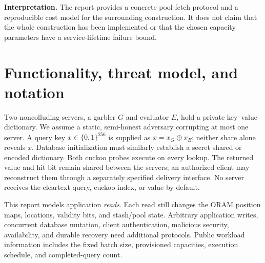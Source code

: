 \documentclass[11pt]{article}
\newcommand{\xor}{\mathbin{\oplus}}
\begin{document}
\textbf{Interpretation.} The report provides a concrete pool-fetch protocol
and a reproducible cost model for the surrounding construction. It does not
claim that the whole construction has been implemented or that the chosen
capacity parameters have a service-lifetime failure bound.

\clearpage
{\small\setlength{\parskip}{0pt}\tableofcontents}
\clearpage

\section{Functionality, threat model, and notation}
\label{sec:scope}
Two noncolluding servers, a garbler $G$ and evaluator $E$, hold a private
key--value dictionary. We assume a static, semi-honest adversary corrupting
at most one server. A query key $x\in\{0,1\}^{256}$ is supplied as
$x=x_G\xor x_E$; neither share alone reveals $x$. Database initialization
must similarly establish a secret shared or encoded dictionary. Both
cuckoo probes execute on every lookup. The returned value and hit bit remain
shared between the servers; an authorized client may reconstruct them through
a separately specified delivery interface. No server receives the cleartext
query, cuckoo index, or value by default.

This report models application \emph{reads}. Each read still changes the ORAM
position maps, locations, validity bits, and stash/pool state. Arbitrary
application writes, concurrent database mutation, client authentication,
malicious security, availability, and durable recovery need additional
protocols. Public workload information includes the fixed batch size,
provisioned capacities, execution schedule, and completed-query count.
\end{document}
